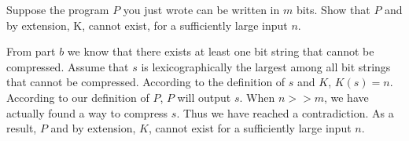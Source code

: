 \documentclass[11pt]{article}
\begin{document}
\begin{Parts}
    \Part Suppose the program $P$ you just wrote can be written in $m$ bits. Show that $P$ and by extension, K, cannot exist, for a sufficiently 
          large input $n$.

    \begin{Answer}
        From part $b$ we know that there exists at least one bit string that cannot be compressed. Assume that $s$ is lexicographically the 
        largest among all bit strings that cannot be compressed. According to the definition of $s$ and $K$, $K(s) = n$. According to our 
        definition of $P$, $P$ will output $s$. When $n >> m$, we have actually found a way to compress $s$. Thus we have reached a 
        contradiction. As a result, $P$ and by extension, $K$, cannot exist for a sufficiently large input $n$. 
    \end{Answer}
    
\end{Parts}
\end{document}
